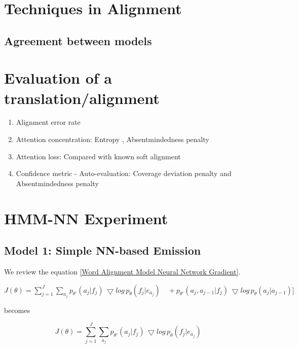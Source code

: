 \documentclass{article}
\begin{document}
\section{Techniques in Alignment}

\subsection{Agreement between models}

\section{Evaluation of a translation/alignment}
\begin{enumerate}
\item Alignment error rate
\item Attention concentration: Entropy \citep{Ghader2017what}, Absentmindedness penalty \citep{Rikters2017confidence}
\item Attention loss: Compared with known soft alignment
\item Confidence metric - Auto-evaluation: Coverage deviation penalty and Absentmindedness penalty \citep{Rikters2017confidence}

\end{enumerate}

\section{HMM-NN Experiment}
\subsection{Model 1: Simple NN-based Emission}
We review the equation \eqref{Word Alignment Model Neural Network Gradient}.

$
J(\theta) = \sum_{j=1}^J \sum_{a_j} p_{\theta'}(a_j|f_j) \, \bigtriangledown log \, p_{\theta}(f_j | e_{a_j}) \quad + p_{\theta'}(a_j, a_{j-1}|f_j) \, \bigtriangledown log \, p_{\theta}(a_j | a_{j-1})  ] 
$

becomes

\begin{equation}
J(\theta) = \sum_{j=1}^J \sum_{a_j} p_{\theta'}(a_j|f_j) \, \bigtriangledown log \, p_{\theta}(f_j | e_{a_j}) \quad
\end{equation}
\end{document}
